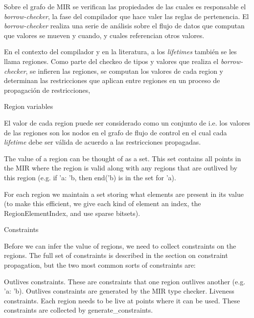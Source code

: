 \documentclass[12pt, a4paper]{article}
\begin{document}


Sobre el grafo de MIR se verifican las propiedades de las cuales es responsable el \textit{borrow-checker}, la fase del compilador que hace valer las reglas de pertenencia.
El \textit{borrow-checker} realiza una serie de análisis sobre el flujo de datos que computan que valores se mueven y cuando, y cuales referencian otros valores.

En el contexto del compilador y en la literatura, a los \textit{lifetimes} también se les llama regiones.
Como parte del checkeo de tipos y valores que realiza el \textit{borrow-checker}, se infieren las regiones, se computan los valores de cada region y determinan las restricciones que aplican entre regiones en un proceso de propagación de restricciones,

Region variables

El valor de cada region puede ser considerado como un conjunto de
i.e. los valores de las regiones son los nodos en el grafo de flujo de control en el cual cada \textit{lifetime} debe ser válida de acuerdo a las restricciones propagadas.

The value of a region can be thought of as a set. This set contains all points in the MIR where the region is valid along with any regions that are outlived by this region (e.g. if 'a: 'b, then end('b) is in the set for 'a).

For each region we maintain a set storing what elements are present in its value (to make this efficient, we give each kind of element an index, the RegionElementIndex, and use sparse bitsets).

Constraints

Before we can infer the value of regions, we need to collect constraints on the regions. The full set of constraints is described in the section on constraint propagation, but the two most common sorts of constraints are:

    Outlives constraints. These are constraints that one region outlives another (e.g. 'a: 'b). Outlives constraints are generated by the MIR type checker.
    Liveness constraints. Each region needs to be live at points where it can be used. These constraints are collected by generate_constraints.
\end{document}
